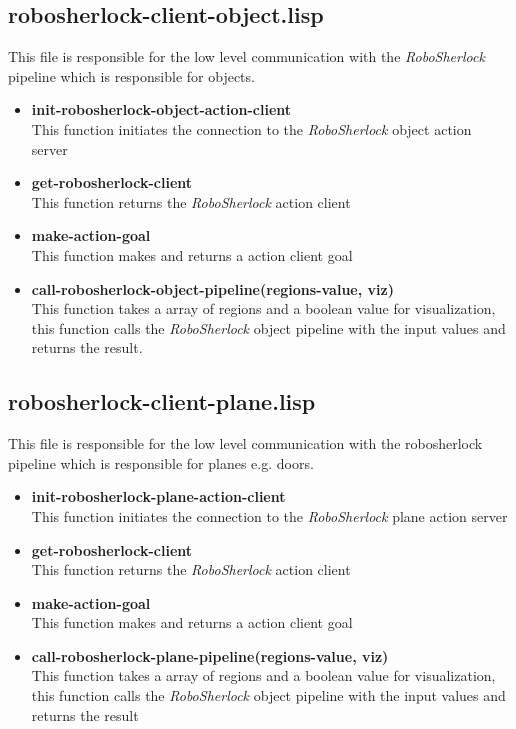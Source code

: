 \documentclass[main.tex]{subfiles}
\begin{document}
		\subsection{robosherlock-client-object.lisp}
		\label{object-perceive}
		This file is responsible for the low level communication with the \textit{RoboSherlock} pipeline which is responsible for objects.
		\begin{itemize}
			\item \textbf{init-robosherlock-object-action-client} \\
			This function initiates the connection to the \textit{RoboSherlock} object action server
			\item \textbf{get-robosherlock-client} \\
			This function returns the \textit{RoboSherlock} action client
			\item \textbf{make-action-goal} \\
			This function makes and returns a action client goal
			\item \textbf{call-robosherlock-object-pipeline(regions-value, viz)} \\
			This function takes a array of regions and a boolean value for visualization, this function calls the \textit{RoboSherlock} object pipeline with the input values and returns the result.
		\end{itemize}
		\subsection{robosherlock-client-plane.lisp}
		This file is responsible for the low level communication with the robosherlock pipeline which is responsible for planes e.g. doors.
		\begin{itemize}
			\item \textbf{init-robosherlock-plane-action-client} \\
			This function initiates the connection to the \textit{RoboSherlock} plane action server
			\item \textbf{get-robosherlock-client} \\
			This function returns the \textit{RoboSherlock} action client
			\item \textbf{make-action-goal} \\
			This function makes and returns a action client goal
			\item \textbf{call-robosherlock-plane-pipeline(regions-value, viz)} \\
			This function takes a array of regions and a boolean value for visualization, this function calls the \textit{RoboSherlock} object pipeline with the input values and returns the result
		\end{itemize}
	\endgroup
\end{document}
